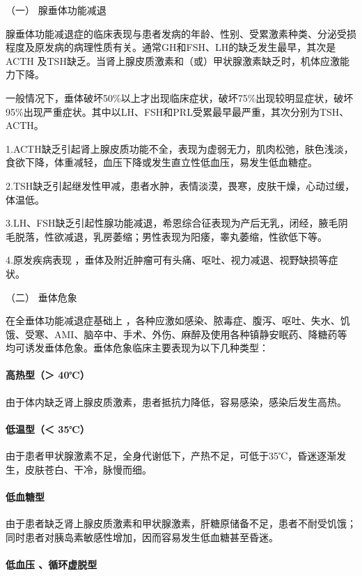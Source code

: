 \hypertarget{text00110.htmlux5cux23CHP4-8-2-1-1}{}
（一） 腺垂体功能减退

腺垂体功能减退症的临床表现与患者发病的年龄、性别、受累激素种类、分泌受损程度及原发病的病理性质有关。通常GH和FSH、LH的缺乏发生最早，其次是ACTH
及TSH缺乏。当肾上腺皮质激素和（或）甲状腺激素缺乏时，机体应激能力下降。

一般情况下，垂体破坏50\%以上才出现临床症状，破坏75\%出现较明显症状，破坏95\%出现严重症状。其中以LH、FSH和PRL受累最早最严重，其次分别为TSH、ACTH。

1.ACTH缺乏引起肾上腺皮质功能不全，表现为虚弱无力，肌肉松弛，肤色浅淡，食欲下降，体重减轻，血压下降或发生直立性低血压，易发生低血糖症。

2.TSH缺乏引起继发性甲减，患者水肿，表情淡漠，畏寒，皮肤干燥，心动过缓，体温低。

3.LH、FSH缺乏引起性腺功能减退，希恩综合征表现为产后无乳，闭经，腋毛阴毛脱落，性欲减退，乳房萎缩；男性表现为阳痿，睾丸萎缩，性欲低下等。

4.原发疾病表现
，垂体及附近肿瘤可有头痛、呕吐、视力减退、视野缺损等症状。

\hypertarget{text00110.htmlux5cux23CHP4-8-2-1-2}{}
（二） 垂体危象

在全垂体功能减退症基础上
，各种应激如感染、脓毒症、腹泻、呕吐、失水、饥饿、受寒、AMI、脑卒中、手术、外伤、麻醉及使用各种镇静安眠药、降糖药等均可诱发垂体危象。垂体危象临床主要表现为以下几种类型：

\paragraph{高热型（＞ 40℃）}

由于体内缺乏肾上腺皮质激素，患者抵抗力降低，容易感染，感染后发生高热。

\paragraph{低温型（＜ 35℃）}

由于患者甲状腺激素不足，全身代谢低下，产热不足，可低于35℃，昏迷逐渐发生，皮肤苍白、干冷，脉慢而细。

\paragraph{低血糖型}

由于患者缺乏肾上腺皮质激素和甲状腺激素，肝糖原储备不足，患者不耐受饥饿；同时患者对胰岛素敏感性增加，因而容易发生低血糖甚至昏迷。

\paragraph{低血压 、循环虚脱型}

